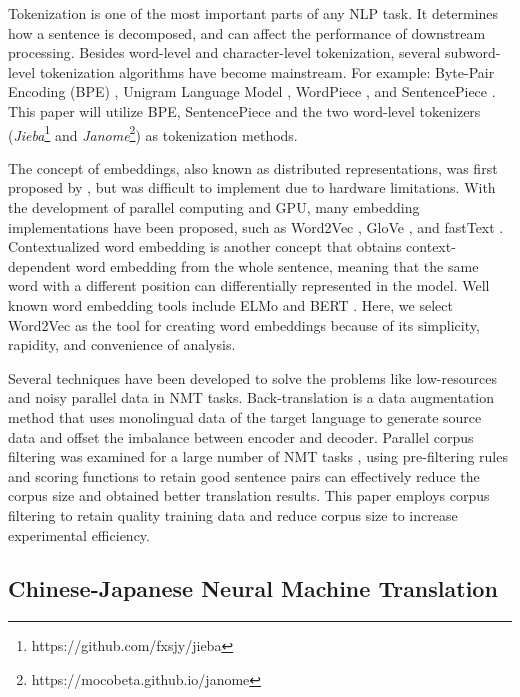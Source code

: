 Tokenization is one of the most important parts of any NLP task. It determines how a sentence is decomposed, and can affect the performance of downstream processing. Besides word-level and character-level tokenization, several subword-level tokenization algorithms have become mainstream. For example: Byte-Pair Encoding (BPE) \cite{sennrich_neural_2016}, Unigram Language Model \cite{kudo-2018-subword}, WordPiece \cite{6289079}, and SentencePiece \cite{kudo-richardson-2018-sentencepiece}. This paper will utilize BPE, SentencePiece \cite{sennrich_neural_2016, kudo-richardson-2018-sentencepiece} and the two word-level tokenizers (\textit{Jieba}\footnote{https://github.com/fxsjy/jieba} and \textit{Janome}\footnote{https://mocobeta.github.io/janome}) as tokenization methods.

The concept of embeddings, also known as distributed representations, was first proposed by \cite{hinton1986learning, bengio2003neural}, but was difficult to implement due to hardware limitations. With the development of parallel computing and GPU, many embedding implementations have been proposed, such as Word2Vec \cite{mikolov2013efficient}, GloVe \cite{pennington2014glove}, and fastText \cite{bojanowski2017enriching}. Contextualized word embedding is another concept that obtains context-dependent word embedding from the whole sentence, meaning that the same word with a different position can differentially represented in the model. Well known word embedding tools include ELMo \cite{peters-etal-2018-deep} and BERT \cite{devlin-etal-2019-bert}. Here, we select Word2Vec \cite{mikolov2013efficient} as the tool for creating word embeddings because of its simplicity, rapidity, and convenience of analysis.

Several techniques have been developed to solve the problems like low-resources and noisy parallel data in NMT tasks. Back-translation \cite{sennrich-etal-2016-improving} is a data augmentation method that uses monolingual data of the target language to generate source data and offset the imbalance between encoder and decoder. Parallel corpus filtering was examined for a large number of NMT tasks \cite{koehn2018findings}, using pre-filtering rules and scoring functions to retain good sentence pairs can effectively reduce the corpus size and obtained better translation results. This paper employs corpus filtering to retain quality training data and reduce corpus size to increase experimental efficiency.

\subsection{Chinese-Japanese Neural Machine Translation}

